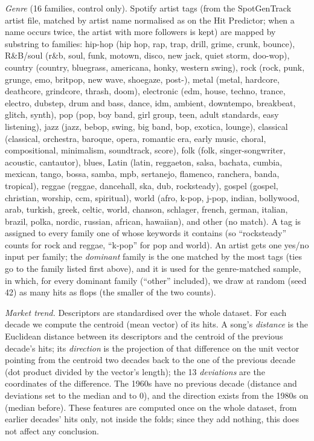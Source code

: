 \emph{Genre} (16 families, control only). Spotify artist tags (from the SpotGenTrack artist file, matched by
artist name normalised as on the Hit Predictor; when a name occurs twice, the artist with more followers is kept) are mapped by
substring to families: hip-hop (hip hop, rap, trap, drill, grime, crunk, bounce), R\&B/soul (r\&b, soul, funk,
motown, disco, new jack, quiet storm, doo-wop), country (country, bluegrass, americana, honky, western swing), rock
(rock, punk, grunge, emo, britpop, new wave, shoegaze, post-), metal (metal, hardcore, deathcore, grindcore, thrash,
doom), electronic (edm, house, techno, trance, electro, dubstep, drum and bass, dance, idm, ambient, downtempo,
breakbeat, glitch, synth), pop (pop, boy band, girl group, teen, adult standards, easy listening), jazz (jazz,
bebop, swing, big band, bop, exotica, lounge), classical (classical, orchestra, baroque, opera, romantic era, early
music, choral, compositional, minimalism, soundtrack, score), folk (folk, singer-songwriter, acoustic, cantautor),
blues, Latin (latin, reggaeton, salsa, bachata, cumbia, mexican, tango, bossa, samba, mpb, sertanejo, flamenco,
ranchera, banda, tropical), reggae (reggae, dancehall, ska, dub, rocksteady), gospel (gospel, christian, worship,
ccm, spiritual), world (afro, k-pop, j-pop, indian, bollywood, arab, turkish, greek, celtic, world, chanson,
schlager, french, german, italian, brazil, polka, nordic, russian, african, hawaiian), and other (no match). A tag is assigned to every family one of whose keywords it contains (so ``rocksteady'' counts for rock and
reggae, ``k-pop'' for pop and world). An artist gets one yes/no input per family; the \emph{dominant} family is the
one matched by the most tags (ties go to the family listed first above), and it is used for the
genre-matched sample, in which, for every dominant family (``other'' included), we draw at random (seed 42) as
many hits as flops (the smaller of the two counts).

\emph{Market trend.} Descriptors are standardised over the whole dataset. For each decade we compute the
centroid (mean vector) of its hits. A song's \emph{distance} is the Euclidean distance between its descriptors and
the centroid of the previous decade's hits; its \emph{direction} is the projection of that difference on the
unit vector pointing from the centroid two decades back to the one of the previous decade (dot product divided by
the vector's length); the 13 \emph{deviations} are the
coordinates of the difference. The 1960s have no previous decade (distance and deviations set to the median and
to 0), and the direction exists from the 1980s on (median before). These features are computed once on the whole
dataset, from earlier decades' hits only, not inside the folds; since they add nothing, this does not affect any
conclusion.

